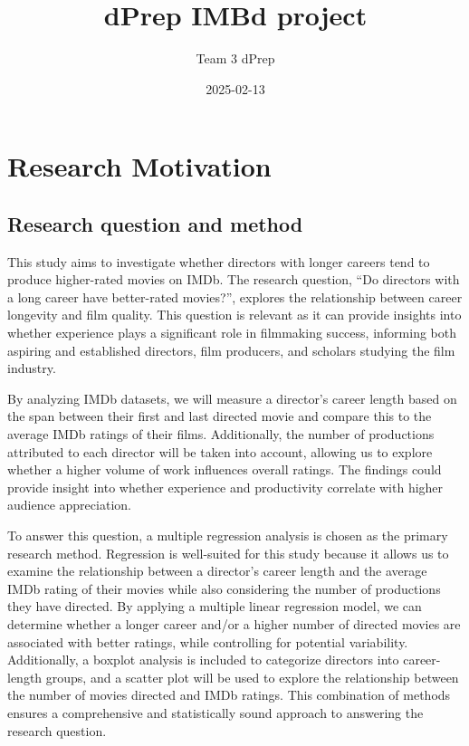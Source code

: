 \documentclass[
]{article}
\title{dPrep IMBd project}
\author{Team 3 dPrep}
\date{2025-02-13}
\begin{document}
\maketitle

\section{Research Motivation}\label{research-motivation}

\subsection{Research question and
method}\label{research-question-and-method}

This study aims to investigate whether directors with longer careers
tend to produce higher-rated movies on IMDb. The research question, ``Do
directors with a long career have better-rated movies?'', explores the
relationship between career longevity and film quality. This question is
relevant as it can provide insights into whether experience plays a
significant role in filmmaking success, informing both aspiring and
established directors, film producers, and scholars studying the film
industry.

By analyzing IMDb datasets, we will measure a director's career length
based on the span between their first and last directed movie and
compare this to the average IMDb ratings of their films. Additionally,
the number of productions attributed to each director will be taken into
account, allowing us to explore whether a higher volume of work
influences overall ratings. The findings could provide insight into
whether experience and productivity correlate with higher audience
appreciation.

To answer this question, a multiple regression analysis is chosen as the
primary research method. Regression is well-suited for this study
because it allows us to examine the relationship between a director's
career length and the average IMDb rating of their movies while also
considering the number of productions they have directed. By applying a
multiple linear regression model, we can determine whether a longer
career and/or a higher number of directed movies are associated with
better ratings, while controlling for potential variability.
Additionally, a boxplot analysis is included to categorize directors
into career-length groups, and a scatter plot will be used to explore
the relationship between the number of movies directed and IMDb ratings.
This combination of methods ensures a comprehensive and statistically
sound approach to answering the research question.
\end{document}
